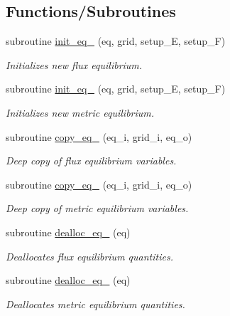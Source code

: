 \subsection*{Functions/\+Subroutines}
\begin{DoxyCompactItemize}
\item 
subroutine \hyperlink{namespaceeq__vars_a0270785c6b513c53e6d7c837f38f377b}{init\+\_\+eq\+\_} (eq, grid, setup\+\_\+E, setup\+\_\+F)
\begin{DoxyCompactList}\small\item\em Initializes new flux equilibrium. \end{DoxyCompactList}\item 
subroutine \hyperlink{namespaceeq__vars_a93947b772250ef73b25bde7688b33bc2}{init\+\_\+eq\+\_} (eq, grid, setup\+\_\+E, setup\+\_\+F)
\begin{DoxyCompactList}\small\item\em Initializes new metric equilibrium. \end{DoxyCompactList}\item 
subroutine \hyperlink{namespaceeq__vars_aa781ffa18b6b17905e126871c43d3267}{copy\+\_\+eq\+\_} (eq\+\_\+i, grid\+\_\+i, eq\+\_\+o)
\begin{DoxyCompactList}\small\item\em Deep copy of flux equilibrium variables. \end{DoxyCompactList}\item 
subroutine \hyperlink{namespaceeq__vars_a50561f7dcd43970bd16a31cd87714c12}{copy\+\_\+eq\+\_} (eq\+\_\+i, grid\+\_\+i, eq\+\_\+o)
\begin{DoxyCompactList}\small\item\em Deep copy of metric equilibrium variables. \end{DoxyCompactList}\item 
subroutine \hyperlink{namespaceeq__vars_ab106dc007ddc896092d0464233b3ce12}{dealloc\+\_\+eq\+\_} (eq)
\begin{DoxyCompactList}\small\item\em Deallocates flux equilibrium quantities. \end{DoxyCompactList}\item 
subroutine \hyperlink{namespaceeq__vars_a206698a627df7d8285921ee4a9f75c11}{dealloc\+\_\+eq\+\_} (eq)
\begin{DoxyCompactList}\small\item\em Deallocates metric equilibrium quantities. \end{DoxyCompactList}\end{DoxyCompactItemize}
